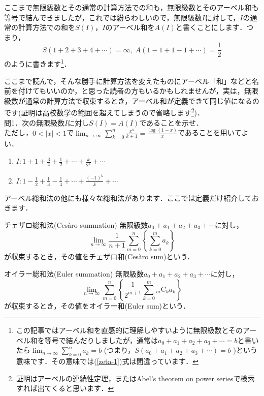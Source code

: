 \documentclass[./main]{subfile}
\begin{document}
ここまで無限級数とその通常の計算方法での和も，無限級数とそのアーベル和も等号で結んできましたが，これでは紛らわしいので，無限級数$I$に対して，$I$の通常の計算方法での和を$S(I)$，$I$のアーベル和を$A(I)$と書くことにします．つまり，
\[
S(1+2+3+4+\cdots)=\infty,\;A(1-1+1-1+\cdots)=\frac{1}{2}
\]
のように書きます\footnote{この記事ではアーベル和を直感的に理解しやすいように無限級数とそのアーベル和を等号で結んだりしましたが，通常は$a_0+a_1+a_2+a_3+\cdots=b$と書いたら$\lim_{n\to\infty}\sum_{k=0}^na_k=b$ (つまり，$S(a_0+a_1+a_2+a_3+\cdots)=b$ )という意味です．その意味では(\ref{zeta-1})式は間違っています．}．

ここまで読んで，そんな勝手に計算方法を変えたものにアーベル「和」などと名前を付けてもいいのか，と思った読者の方もいるかもしれませんが，実は，無限級数が通常の計算方法で収束するとき，アーベル和が定義できて同じ値になるのです(証明は高校数学の範囲を超えてしまうので省略します\footnote{証明はアーベルの連続性定理，またはAbel's theorem on power seriesで検索すれば出てくると思います．})．\vspace{1\baselineskip}\\
問1．次の無限級数$I$に対し$S(I)=A(I)$であることを示せ．\\
ただし，$0<|x|<1$で$\lim_{n\to\infty}\sum_{k=0}^n\frac{x^k}{k+1}=\frac{\log(1-x)}{x}$であることを用いてよい．
\begin{enumerate}[label=(\arabic*)]
\item $I:1+1+\frac{3}{4}+\frac{1}{2}+\cdots+\frac{k}{2^k}+\cdots$
\item $I:1-\frac{1}{2}+\frac{1}{3}-\frac{1}{4}+\cdots+\frac{(-1)^k}{k}+\cdots$
\end{enumerate}\vspace{1\baselineskip}

アーベル総和法の他にも様々な総和法があります．ここでは定義だけ紹介しておきます．
\begin{itembox}[l]{チェザロ\footnotemark{}総和法(Ces\`aro summation)}
無限級数$a_0+a_1+a_2+a_3+\cdots$に対し，
\[
\lim_{n\to\infty}\frac{1}{n+1}\sum_{m=0}^n\left\{\sum_{k=0}^ma_k\right\}
\]
が収束するとき，その値をチェザロ和(Ces\`aro sum)という．
\end{itembox}
\addtocounter{footnote}{-1}
\begin{itembox}[l]{オイラー\footnotemark{}総和法(Euler summation)}
無限級数$a_0+a_1+a_2+a_3+\cdots$に対し，
\[
\lim_{n\to\infty}\sum_{m=0}^n\left\{\frac{1}{2^{m+1}}\sum_{k=0}^m{}_m\mathrm{C}_ka_k\right\}
\]
が収束するとき，その値をオイラー和(Euler sum)という．
\end{itembox}
\addtocounter{footnote}{-1}
\end{document}
